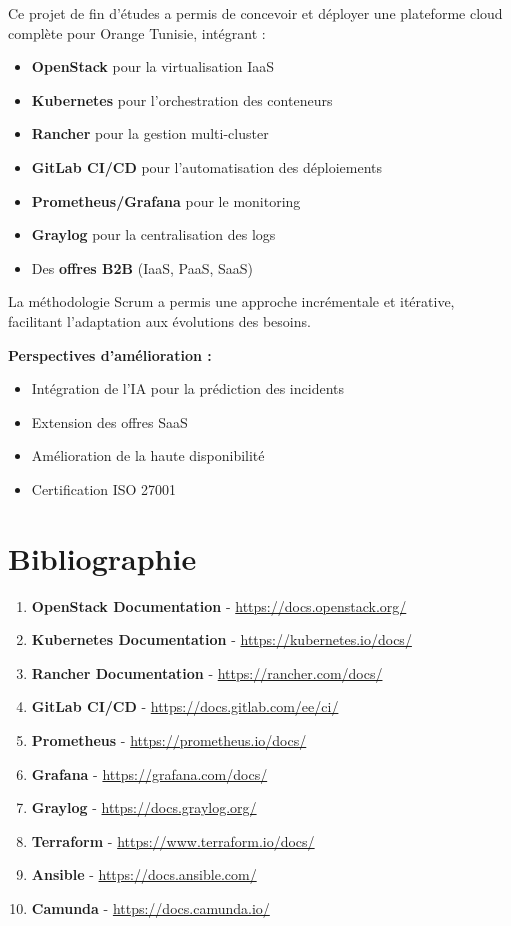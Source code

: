 \documentclass[12pt,a4paper,twoside]{report}
\begin{document}
Ce projet de fin d'études a permis de concevoir et déployer une plateforme cloud complète pour Orange Tunisie, intégrant :

\begin{itemize}
    \item \textbf{OpenStack} pour la virtualisation IaaS
    \item \textbf{Kubernetes} pour l'orchestration des conteneurs
    \item \textbf{Rancher} pour la gestion multi-cluster
    \item \textbf{GitLab CI/CD} pour l'automatisation des déploiements
    \item \textbf{Prometheus/Grafana} pour le monitoring
    \item \textbf{Graylog} pour la centralisation des logs
    \item Des \textbf{offres B2B} (IaaS, PaaS, SaaS)
\end{itemize}

La méthodologie Scrum a permis une approche incrémentale et itérative, facilitant l'adaptation aux évolutions des besoins.

\textbf{Perspectives d'amélioration :}
\begin{itemize}
    \item Intégration de l'IA pour la prédiction des incidents
    \item Extension des offres SaaS
    \item Amélioration de la haute disponibilité
    \item Certification ISO 27001
\end{itemize}

\newpage

\chapter*{Bibliographie}

\begin{enumerate}
    \item \textbf{OpenStack Documentation} - \url{https://docs.openstack.org/}
    \item \textbf{Kubernetes Documentation} - \url{https://kubernetes.io/docs/}
    \item \textbf{Rancher Documentation} - \url{https://rancher.com/docs/}
    \item \textbf{GitLab CI/CD} - \url{https://docs.gitlab.com/ee/ci/}
    \item \textbf{Prometheus} - \url{https://prometheus.io/docs/}
    \item \textbf{Grafana} - \url{https://grafana.com/docs/}
    \item \textbf{Graylog} - \url{https://docs.graylog.org/}
    \item \textbf{Terraform} - \url{https://www.terraform.io/docs/}
    \item \textbf{Ansible} - \url{https://docs.ansible.com/}
    \item \textbf{Camunda} - \url{https://docs.camunda.io/}
\end{enumerate}
\end{document}
